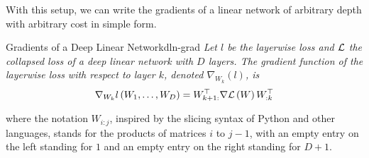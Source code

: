 \documentclass[../../thesis.tex]{subfiles}
\begin{document}
With this setup,
we can write the gradients of a linear network
of arbitrary depth
with arbitrary cost in simple form.
\begin{theorem}{Gradients of a Deep Linear Network}{dln-grad}
	\emph{%
	Let $l$ be the layerwise loss
	and ${\mathcal{L}}$ the collapsed loss
	of a deep linear network
	with $D$ layers.
	The gradient function of the layerwise loss
	with respect to layer $k$,
	denoted $\nabla_{W_k}(l)$, is
	\begin{equation}
		\grad{_{W_k} l}{W_1, \dots, W_D}
		= W_{k+1:}^\top \grad{\cL}{W} W_{:k}^\top\equationlabel{def-dln-grad}
	\end{equation}
	}
\end{theorem}
\noindent where the notation $W_{i:j}$,
inspired by the slicing syntax of Python and other languages,
stands for the products of matrices $i$ to $j-1$,
with an empty entry on the left standing for $1$
and an empty entry on the right standing for $D+1$.
\end{document}
